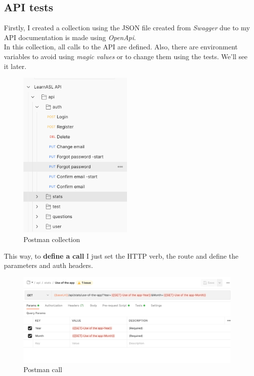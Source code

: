 \subsection{API tests}
Firstly, I created a collection using the JSON file created from \textit{Swagger} due to my API documentation is made using \textit{OpenApi}. \\
In this collection, all calls to the API are defined. Also, there are environment variables to avoid using \textit{magic values} or to change them using the tests. We'll see it later.
\begin{figure}[H]
    \centering
        \includegraphics[width=0.5\textwidth]{assets/postman_collection.png}
    \caption{Postman collection}
    \label{fig:test_collection}
\end{figure}

This way, to \textbf{define a call} I just set the HTTP verb, the route and define the parameters and auth headers.
\begin{figure}[H]
    \centering
        \includegraphics[width=\textwidth]{assets/postman_call.png}
    \caption{Postman call}
    \label{fig:test_call}
\end{figure}


